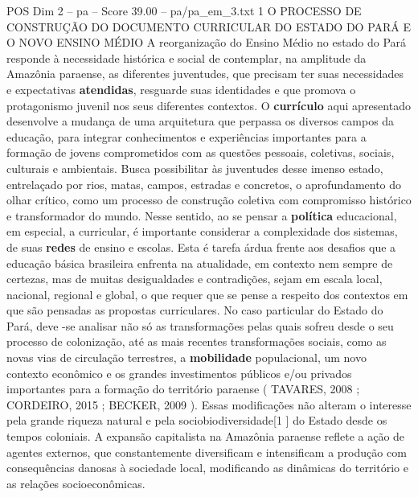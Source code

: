 \begin{textsample}{POS Dim 2 – pa – Score 39.00 – pa/pa\_em\_3.txt}  \label{ex:f2_pos_061}
1 O PROCESSO DE CONSTRUÇÃO DO DOCUMENTO CURRICULAR DO ESTADO DO PARÁ E O NOVO ENSINO MÉDIO A reorganização do Ensino Médio no estado do Pará responde à necessidade histórica e social de contemplar, na amplitude da Amazônia paraense, as diferentes juventudes, que precisam ter suas necessidades e expectativas \textbf{atendidas}, resguarde suas identidades e que promova o protagonismo juvenil nos seus diferentes contextos.
O \textbf{currículo} aqui apresentado desenvolve a mudança de uma arquitetura que perpassa os diversos campos da educação, para integrar conhecimentos e experiências importantes para a formação de jovens comprometidos com as questões pessoais, coletivas, sociais, culturais e ambientais.
Busca possibilitar às juventudes desse imenso estado, entrelaçado por rios, matas, campos, estradas e concretos, o aprofundamento do olhar crítico, como um processo de construção coletiva com compromisso histórico e transformador do mundo.
Nesse sentido, ao se pensar a \textbf{política} educacional, em especial, a curricular, é importante considerar a complexidade dos sistemas, de suas \textbf{redes} de ensino e escolas.
Esta é tarefa árdua frente aos desafios que a educação básica brasileira enfrenta na atualidade, em contexto nem sempre de certezas, mas de muitas desigualdades e contradições, sejam em escala local, nacional, regional e global, o que requer que se pense a respeito dos contextos em que são pensadas as propostas curriculares.
No caso particular do Estado do Pará, deve -se analisar não só as transformações pelas quais sofreu desde o seu processo de colonização, até as mais recentes transformações sociais, como as novas vias de circulação terrestres, a \textbf{mobilidade} populacional, um novo contexto econômico e os grandes investimentos públicos e/ou privados importantes para a formação do território paraense ( TAVARES, 2008 ; CORDEIRO, 2015 ; BECKER, 2009 ).
Essas modificações não alteram o interesse pela grande riqueza natural e pela sociobiodiversidade[1 ] do Estado desde os tempos coloniais.
A expansão capitalista na Amazônia paraense reflete a ação de agentes externos, que constantemente diversificam e intensificam a produção com consequências danosas à sociedade local, modificando as dinâmicas do território e as relações socioeconômicas.

\end{textsample}
